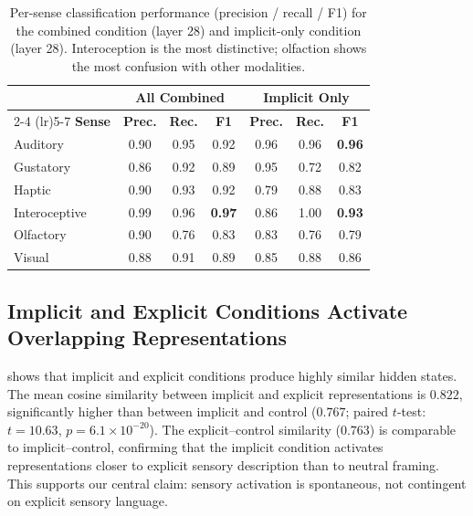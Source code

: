 \begin{table}[t]
\centering
\caption{Per-sense classification performance (precision / recall / F1) for the combined condition (layer 28) and implicit-only condition (layer 28). Interoception is the most distinctive; olfaction shows the most confusion with other modalities.}
\label{tab:per_sense}
\small
\begin{tabular}{@{}lcccccc@{}}
\toprule
& \multicolumn{3}{c}{\textbf{All Combined}} & \multicolumn{3}{c}{\textbf{Implicit Only}} \\
\cmidrule(lr){2-4} \cmidrule(lr){5-7}
\textbf{Sense} & \textbf{Prec.} & \textbf{Rec.} & \textbf{F1} & \textbf{Prec.} & \textbf{Rec.} & \textbf{F1} \\
\midrule
Auditory & 0.90 & 0.95 & 0.92 & 0.96 & 0.96 & {\bf 0.96} \\
Gustatory & 0.86 & 0.92 & 0.89 & 0.95 & 0.72 & 0.82 \\
Haptic & 0.90 & 0.93 & 0.92 & 0.79 & 0.88 & 0.83 \\
Interoceptive & 0.99 & 0.96 & {\bf 0.97} & 0.86 & 1.00 & {\bf 0.93} \\
Olfactory & 0.90 & 0.76 & 0.83 & 0.83 & 0.76 & 0.79 \\
Visual & 0.88 & 0.91 & 0.89 & 0.85 & 0.88 & 0.86 \\
\bottomrule
\end{tabular}
\end{table}

\subsection{Implicit and Explicit Conditions Activate Overlapping Representations}
\label{sec:results-similarity}

 shows that implicit and explicit conditions produce highly similar hidden states. The mean cosine similarity between implicit and explicit representations is $0.822$, significantly higher than between implicit and control ($0.767$; paired $t$-test: $t = 10.63$, $p = 6.1 \times 10^{-20}$). The explicit--control similarity ($0.763$) is comparable to implicit--control, confirming that the implicit condition activates representations closer to explicit sensory description than to neutral framing. This supports our central claim: sensory activation is spontaneous, not contingent on explicit sensory language.

